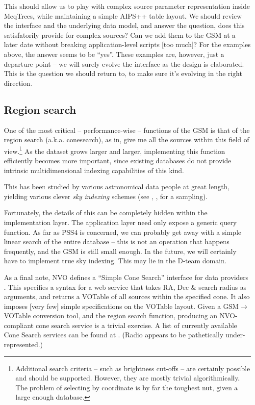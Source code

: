 \documentclass[10pt]{article}
\begin{document}
This should allow us to play with complex source parameter representation
inside MeqTrees, while maintaining a simple AIPS++ table layout. We should
review the interface and the underlying data model, and answer the question,
does this satisfatorily provide for complex sources? Can we add them to the GSM
at a later date without breaking application-level scripts [too much]? For the
examples above, the answer seems to be ``yes''. These examples are, however,
just a departure point -- we will surely evolve the interface as the design is
elaborated. This is the question we should return to, to make sure it's
evolving in the right direction.

\subsection{Region search}

One of the most critical -- performance-wise -- functions of the GSM is that of
the region search (a.k.a. conesearch), as in, give me all the sources within
this field of view.\footnote{Additional search criteria -- such as brightness
cut-offs -- are certainly possible and should be supported. However, they are
mostly trivial algorithmically. The problem of selecting by coordinate is by
far the toughest nut, given a large enough database.} As the dataset grows
larger and larger, implementing this function efficiently becomes more
important, since existing databases do not provide intrinsic multidimensional
indexing capabilities of this kind. 

This has been studied by various astronomical data people at great
length, yielding various clever {\em sky indexing} schemes (see \cite{SI1},
\cite{SI2}, \cite{SI3} for a sampling).

Fortunately, the details of this can be completely hidden within the
implementation layer. The application layer need only expose a generic query
function. As far as PSS4 is concerned, we can probably get away with a simple
linear search of the entire database -- this is not an operation that happens
frequently, and the GSM is still small enough. In the future, we will
certainly have to implement true sky indexing. This may lie in the D-team
domain.

As a final note, NVO defines a ``Simple Cone Search'' interface for data
providers \cite{CS1}. This specifies a syntax for a web service that takes RA,
Dec \& search radius as arguments, and returns a VOTable of all sources within
the specified cone. It also imposes [very few] simple specifications on the
VOTable layout. Given a GSM$\rightarrow$VOTable conversion tool, and the region
search function, producing an NVO-compliant cone search service is a trivial
exercise. A list of currently available Cone Search services can be found at
\cite{CS2}. (Radio appears to be pathetically under-represented.)
\end{document}
